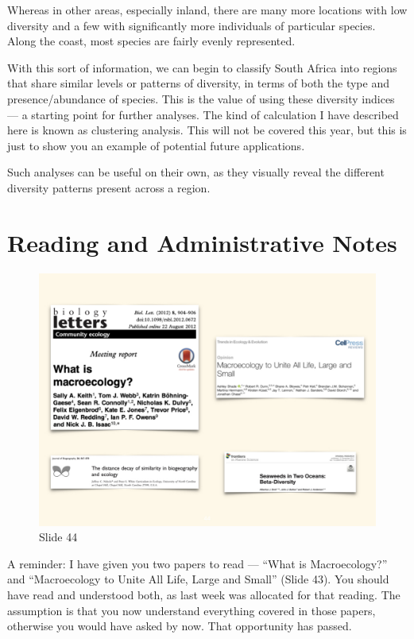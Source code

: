 \documentclass[
  10pt,
]{book}
\begin{document}
Whereas in other areas, especially inland, there are many more locations
with low diversity and a few with significantly more individuals of
particular species. Along the coast, most species are fairly evenly
represented.

With this sort of information, we can begin to classify South Africa
into regions that share similar levels or patterns of diversity, in
terms of both the type and presence/abundance of species. This is the
value of using these diversity indices --- a starting point for further
analyses. The kind of calculation I have described here is known as
clustering analysis. This will not be covered this year, but this is
just to show you an example of potential future applications.

Such analyses can be useful on their own, as they visually reveal the
different diversity patterns present across a region.

\section{Reading and Administrative
Notes}\label{reading-and-administrative-notes}

\begin{figure}[ht]
\centering
\includegraphics[width=0.8\linewidth]{../images/BDC334/BDC334-044.jpeg}
\caption*{Slide 44}
\end{figure}

A reminder: I have given you two papers to read --- ``What is
Macroecology?'' and ``Macroecology to Unite All Life, Large and Small''
(Slide 43). You should have read and understood both, as last week was
allocated for that reading. The assumption is that you now understand
everything covered in those papers, otherwise you would have asked by
now. That opportunity has passed.
\end{document}
